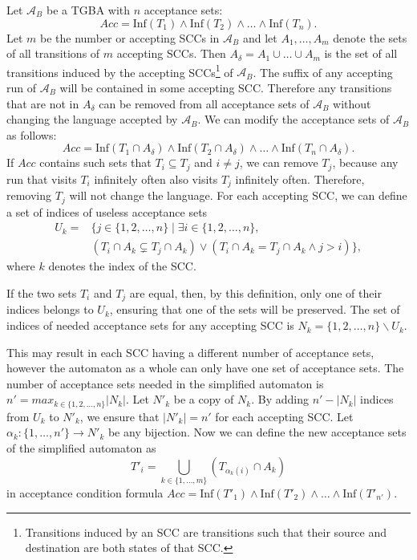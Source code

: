 \documentclass[
  digital, %
  twoside, %
  table,   %
  lof,     %
  lot,     %
]{fithesis3}
\begin{document}
Let $\mathcal{A}_B$ be a TGBA with $n$ acceptance sets: 
\begin{equation*}
  Acc = \text{Inf}(T_1) \wedge \text{Inf}(T_2) \wedge \dots \wedge \text{Inf}(T_n).
\end{equation*}
Let $m$ be the number or accepting SCCs in $\mathcal{A}_B$ and let $A_1, \dots, A_m$ denote the sets of all transitions of $m$ accepting SCCs. Then $A_\delta = A_1 \cup \dots \cup A_m$ is the set of all transitions induced by the accepting SCCs\footnote{Transitions induced by an SCC are transitions such that their source and destination are both states of that SCC.} of $\mathcal{A}_B$. 
The suffix of any accepting run of $\mathcal{A}_B$ will be contained in some accepting SCC. Therefore any transitions that are not in $A_\delta$ can be removed from all acceptance sets of $\mathcal{A}_B$ without changing the language accepted by $\mathcal{A}_B$. We can modify the acceptance sets of $\mathcal{A}_B$ as follows: 
\begin{equation*}
  Acc = \text{Inf}(T_1 \cap A_\delta) \wedge \text{Inf}(T_2 \cap A_\delta) \wedge \dots \wedge \text{Inf}(T_n \cap A_\delta).
\end{equation*}
If $Acc$ contains such sets that $T_i \subseteq T_j$ and $i \neq j$, we can remove $T_j$, because any run that visits $T_i$ infinitely often also visits $T_j$ infinitely often. Therefore, removing $T_j$ will not change the language.
For each accepting SCC, we can define a set of indices of useless acceptance sets 
\begin{equation*}
  \begin{aligned}
    U_k = &\{ j \in \{1, 2, \dots, n\} \mid \exists i \in \{1, 2, \dots, n\}, \\
    &(T_i \cap A_k \subsetneq T_j \cap A_k) \vee (T_i \cap A_k = T_j \cap A_k \wedge j > i)\},
  \end{aligned}
\end{equation*}
where $k$ denotes the index of the SCC.

If the two sets $T_i$ and $T_j$ are equal, then, by this definition, only one of their indices belongs to $U_k$, ensuring that one of the sets will be preserved. The set of indices of needed acceptance sets for any accepting SCC is $N_k = \{1, 2, \dots, n\} \smallsetminus U_k$. 

This may result in each SCC having a different number of acceptance sets, however the automaton as a whole can only have one set of acceptance sets. The number of acceptance sets needed in the simplified automaton is $n' = max_{k \in \{1, 2, \dots, n\}} |N_k|$. Let $N'_k$ be a copy of $N_k$. By adding $n' - |N_k|$ indices from $U_k$ to $N'_k$, we ensure that $|N'_k| = n'$ for each accepting SCC. Let $\alpha_k \colon \{1, \dots, n'\} \to N'_k$ be any bijection. Now we can define the new acceptance sets of the simplified automaton as
\begin{equation*}
  T'_i = \underset{k \in \{1, \dots, m\}}\bigcup (T_{\alpha_k(i)} \cap A_k)
\end{equation*}
in acceptance condition formula $Acc = \text{Inf}(T'_1) \wedge \text{Inf}(T'_2) \wedge \dots \wedge \text{Inf}(T'_{n'})$.
\end{document}
